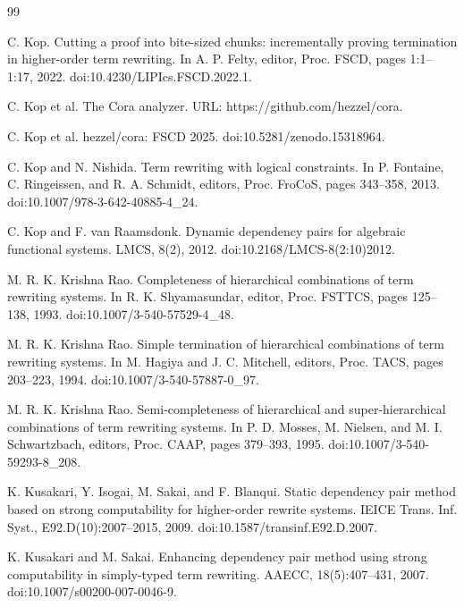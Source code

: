 \documentclass[10pt,a4paper]{amsart}
\begin{document}
\begin{thebibliography}{99}
\par\noindent  [26]  C. Kop.  Cutting a proof into bite-sized chunks: incrementally proving termination in higher-order term rewriting.  In A. P. Felty, editor, Proc. FSCD, pages 1:1–1:17, 2022.  doi:10.4230/LIPIcs.FSCD.2022.1.  
 
\par\noindent  [27]  C. Kop et al.  The Cora analyzer.  URL: https://github.com/hezzel/cora.  
 
\par\noindent  [28]  C. Kop et al.  hezzel/cora: FSCD 2025.  doi:10.5281/zenodo.15318964.  
 
\par\noindent  [29]  C. Kop and N. Nishida.  Term rewriting with logical constraints.  In P. Fontaine, C. Ringeissen, and R. A. Schmidt, editors, Proc. FroCoS, pages 343–358, 2013.  doi:10.1007/978-3-642-40885-4\_24.  
 
\par\noindent  [30]  C. Kop and F. van Raamsdonk.  Dynamic dependency pairs for algebraic functional systems.  LMCS, 8(2), 2012.  doi:10.2168/LMCS-8(2:10)2012.  
 
\par\noindent  [31]  M. R. K. Krishna Rao.  Completeness of hierarchical combinations of term rewriting systems.  In R. K. Shyamasundar, editor, Proc. FSTTCS, pages 125–138, 1993.  doi:10.1007/3-540-57529-4\_48.  
 
\par\noindent  [32]  M. R. K. Krishna Rao.  Simple termination of hierarchical combinations of term rewriting systems.  In M. Hagiya and J. C. Mitchell, editors, Proc. TACS, pages 203–223, 1994.  doi:10.1007/3-540-57887-0\_97.  
 
\par\noindent  [33]  M. R. K. Krishna Rao.  Semi-completeness of hierarchical and super-hierarchical combinations of term rewriting systems.  In P. D. Mosses, M. Nielsen, and M. I. Schwartzbach, editors, Proc. CAAP, pages 379–393, 1995.  doi:10.1007/3-540-59293-8\_208.  
 
\par\noindent  [34]  K. Kusakari, Y. Isogai, M. Sakai, and F. Blanqui.  Static dependency pair method based on strong computability for higher-order rewrite systems.  IEICE Trans. Inf. Syst., E92.D(10):2007–2015, 2009.  doi:10.1587/transinf.E92.D.2007.  
 
\par\noindent  [35]  K. Kusakari and M. Sakai.  Enhancing dependency pair method using strong computability in simply-typed term rewriting.  AAECC, 18(5):407–431, 2007.  doi:10.1007/s00200-007-0046-9.  
 

\end{thebibliography}
\end{document}
